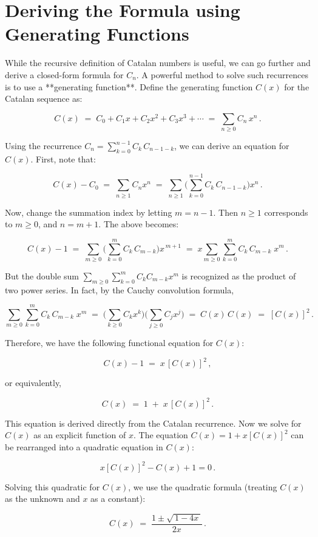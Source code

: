 \documentclass[docmute]{article}
\begin{document}
\section{Deriving the Formula using Generating Functions}

While the recursive definition of Catalan numbers is useful, we can go further and derive a closed-form formula for $C_n$. A powerful method to solve such recurrences is to use a **generating function**. Define the generating function $C(x)$ for the Catalan sequence as:

\[
C(x) \;=\; C_0 + C_1 x + C_2 x^2 + C_3 x^3 + \cdots \;=\; \sum_{n\ge 0} C_n \, x^n\,.
\]

Using the recurrence $C_n = \sum_{k=0}^{n-1} C_k\,C_{n-1-k}$, we can derive an equation for $C(x)$. First, note that:

\[
C(x) - C_0 \;=\; \sum_{n\ge 1} C_n x^n \;=\; \sum_{n\ge 1}\Big(\sum_{k=0}^{n-1} C_k\,C_{n-1-k}\Big) x^n\,.
\]

Now, change the summation index by letting $m = n-1$. Then $n\ge 1$ corresponds to $m \ge 0$, and $n = m+1$. The above becomes:

\[
C(x) - 1 \;=\; \sum_{m\ge 0} \Big(\sum_{k=0}^{m} C_k\,C_{m-k}\Big) x^{\,m+1} \;=\; x \sum_{m\ge 0} \sum_{k=0}^{m} C_k\,C_{m-k}\; x^m\,.
\]

But the double sum $\sum_{m\ge 0}\sum_{k=0}^{m} C_k C_{m-k} x^m$ is recognized as the product of two power series. In fact, by the Cauchy convolution formula, 

\[
\sum_{m\ge 0}\sum_{k=0}^{m} C_k\,C_{m-k}\; x^m \;=\; \Big(\sum_{k\ge 0} C_k x^k\Big)\Big(\sum_{j\ge 0} C_j x^j\Big) \;=\; C(x)\,C(x) \;=\; [C(x)]^2\,.
\]

Therefore, we have the following functional equation for $C(x)$:

\[
C(x) - 1 \;=\; x\,[C(x)]^2\,,
\] 

or equivalently,

\[
C(x) \;=\; 1 \;+\; x\,[C(x)]^2\,.
\]

This equation is derived directly from the Catalan recurrence. Now we solve for $C(x)$ as an explicit function of $x$. The equation $C(x) = 1 + x[C(x)]^2$ can be rearranged into a quadratic equation in $C(x)$:

\[
x [C(x)]^2 - C(x) + 1 = 0\,.
\]

Solving this quadratic for $C(x)$, we use the quadratic formula (treating $C(x)$ as the unknown and $x$ as a constant):

\[
C(x) \;=\; \frac{1 \pm \sqrt{\,1 - 4x\,}}{2x}\,. 
\]
\end{document}
